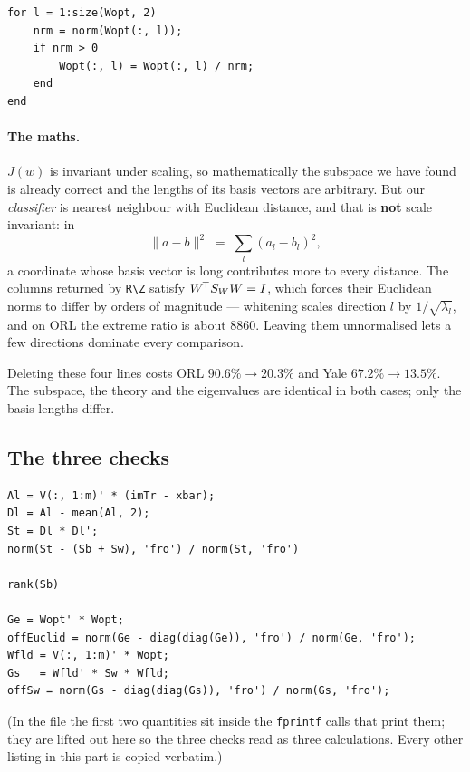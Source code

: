 \begin{lstlisting}
for l = 1:size(Wopt, 2)
    nrm = norm(Wopt(:, l));
    if nrm > 0
        Wopt(:, l) = Wopt(:, l) / nrm;
    end
end
\end{lstlisting}

\paragraph{The maths.} $J(w)$ is invariant under scaling, so mathematically the
subspace we have found is already correct and the lengths of its basis vectors
are arbitrary. But our \emph{classifier} is nearest neighbour with Euclidean
distance, and that is \textbf{not} scale invariant: in
\[
  \|a - b\|^2 \;=\; \sum_{l} (a_l - b_l)^2 ,
\]
a coordinate whose basis vector is long contributes more to every distance.
The columns returned by \texttt{R\textbackslash Z} satisfy
$W^{\!\top}S_W W = I$, which forces their Euclidean norms to differ by orders
of magnitude --- whitening scales direction $l$ by $1/\sqrt{\lambda_l}$, and on
ORL the extreme ratio is about $8860$. Leaving them unnormalised lets a few
directions dominate every comparison.

\begin{observation}
Deleting these four lines costs ORL $90.6\% \to 20.3\%$ and Yale
$67.2\% \to 13.5\%$. The subspace, the theory and the eigenvalues are
identical in both cases; only the basis lengths differ.
\end{observation}

\subsection{The three checks}

\begin{lstlisting}
Al = V(:, 1:m)' * (imTr - xbar);
Dl = Al - mean(Al, 2);
St = Dl * Dl';
norm(St - (Sb + Sw), 'fro') / norm(St, 'fro')

rank(Sb)

Ge = Wopt' * Wopt;
offEuclid = norm(Ge - diag(diag(Ge)), 'fro') / norm(Ge, 'fro');
Wfld = V(:, 1:m)' * Wopt;
Gs   = Wfld' * Sw * Wfld;
offSw = norm(Gs - diag(diag(Gs)), 'fro') / norm(Gs, 'fro');
\end{lstlisting}

\noindent(In the file the first two quantities sit inside the \texttt{fprintf}
calls that print them; they are lifted out here so the three checks read as
three calculations. Every other listing in this part is copied verbatim.)

